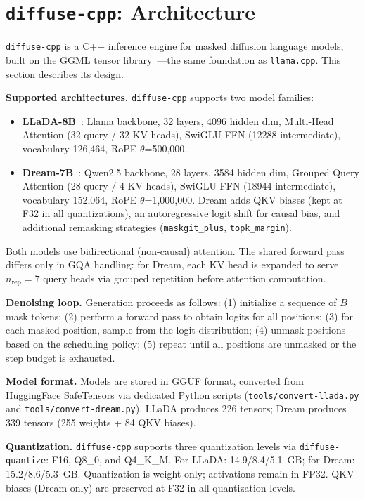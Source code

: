 \documentclass[11pt]{article}
\begin{document}
\section{\texttt{diffuse-cpp}: Architecture}

\texttt{diffuse-cpp} is a C++ inference engine for masked diffusion language models,
built on the GGML tensor library~\cite{gerganov2023}---the same foundation as
\texttt{llama.cpp}. This section describes its design.

\textbf{Supported architectures.} \texttt{diffuse-cpp} supports two model families:

\begin{itemize}
\item \textbf{LLaDA-8B}~\cite{nie2025}: Llama backbone, 32 layers, 4096 hidden dim,
  Multi-Head Attention (32 query / 32 KV heads), SwiGLU FFN (12288 intermediate),
  vocabulary 126{,}464, RoPE $\theta$=500{,}000.
\item \textbf{Dream-7B}~\cite{ye2025}: Qwen2.5 backbone, 28 layers, 3584 hidden dim,
  Grouped Query Attention (28 query / 4 KV heads), SwiGLU FFN (18944 intermediate),
  vocabulary 152{,}064, RoPE $\theta$=1{,}000{,}000. Dream adds QKV biases (kept at F32
  in all quantizations), an autoregressive logit shift for causal bias, and additional
  remasking strategies (\texttt{maskgit\_plus}, \texttt{topk\_margin}).
\end{itemize}

Both models use bidirectional (non-causal) attention. The shared forward pass differs
only in GQA handling: for Dream, each KV head is expanded to serve $n_\text{rep}=7$
query heads via grouped repetition before attention computation.

\textbf{Denoising loop.} Generation proceeds as follows: (1) initialize a sequence of
$B$ mask tokens; (2) perform a forward pass to obtain logits for all positions; (3) for
each masked position, sample from the logit distribution; (4) unmask positions based on
the scheduling policy; (5) repeat until all positions are unmasked or the step budget is
exhausted.

\textbf{Model format.} Models are stored in GGUF format, converted from HuggingFace
SafeTensors via dedicated Python scripts (\texttt{tools/convert-llada.py} and
\texttt{tools/convert-dream.py}). LLaDA produces 226 tensors; Dream produces 339
tensors (255 weights + 84 QKV biases).

\textbf{Quantization.} \texttt{diffuse-cpp} supports three quantization levels via
\texttt{diffuse-quantize}: F16, Q8\_0, and Q4\_K\_M. For LLaDA: 14.9/8.4/5.1~GB;
for Dream: 15.2/8.6/5.3~GB. Quantization is weight-only; activations remain in FP32.
QKV biases (Dream only) are preserved at F32 in all quantization levels.
\end{document}
